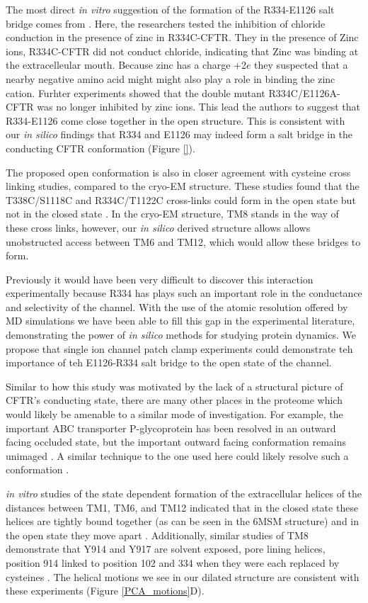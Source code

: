 The most direct \textit{in vitro} suggestion of the formation of the R334-E1126 salt bridge comes from \cite{wang2016}. Here, the researchers tested the inhibition of chloride conduction in the presence of zinc in R334C-CFTR. They in the presence of Zinc ions, R334C-CFTR did not conduct chloride, indicating that Zinc was binding at the extracelleular mouth. Because zinc has a charge +2$e$ they suspected that a nearby negative amino acid might might also play a role in binding the zinc cation. Furhter experiments showed that the double mutant R334C/E1126A-CFTR was no longer inhibited by zinc ions. This lead the authors to suggest that R334-E1126 come close together in the open structure. This is consistent with our \textit{in silico} findings that R334 and E1126 may indeed form a salt bridge in the conducting CFTR conformation (Figure \ref{}).  

The proposed open conformation is also in closer agreement with cysteine cross linking studies, compared to the cryo-EM structure. These studies found that the T338C/S1118C and R334C/T1122C cross-links could form in the open state but not in the closed state \cite{wang2012}. In the cryo-EM structure, TM8 stands in the way of these cross links, however, our \textit{in silico} derived structure allows allows unobstructed access between TM6 and TM12, which would allow these bridges to form.

Previously it would have been very difficult to discover this interaction experimentally because R334 has plays such an important role in the conductance and selectivity of the channel. With the use of the atomic resolution offered by MD simulations we have been able to fill this gap in the experimental literature, demonstrating the power of \textit {in silico} methods for studying protein dynamics. We propose that single ion channel patch clamp experiments could demonstrate teh importance of teh E1126-R334 salt bridge to the open state of the channel. 

Similar to how this study was motivated by the lack of a structural picture of CFTR's conducting state, there are many other places in the proteome which would likely be amenable to a similar mode of investigation. For example, the important ABC transporter P-glycoprotein has been resolved in an outward facing occluded state, but the important outward facing conformation remains unimaged \cite{kim2018}. A similar technique to the one used here could likely resolve such a conformation \cite{kim2018a}.

\textit {in vitro} studies of the state dependent formation of the extracellular helices of the distances between  TM1, TM6, and TM12 indicated that in the closed state these helices are tightly bound together (as can be seen in the 6MSM structure) and in the open state they move apart \cite{negoda2018}. Additionally, similar studies of TM8 demonstrate that Y914 and Y917 are solvent exposed, pore lining helices, position 914 linked to position 102 and 334 when they were each replaced by cysteines \cite{negoda2019}. The helical motions we see in our dilated structure are consistent with these experiments (Figure \ref{PCA_motions}D). 

